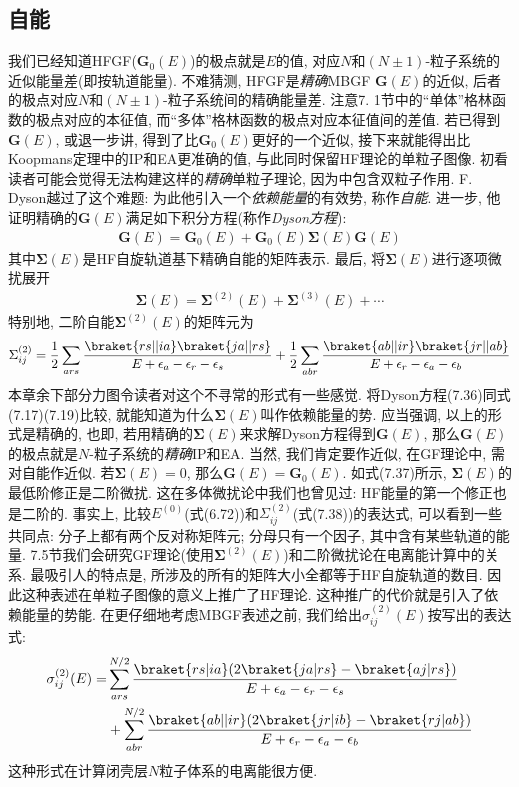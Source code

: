 \subsection{自能}
我们已经知道HFGF($\mathbf{G}_0(E)$)的极点就是$E$的值, 
对应$N$和$(N\pm1)$-粒子系统的近似能量差(即按轨道能量). 
不难猜测, 
HFGF是\emph{精确}MBGF $\mathbf{G}(E)$的近似, 
后者的极点对应$N$和$(N\pm1)$-粒子系统间的精确能量差. 
注意7.
1节中的“单体”格林函数的极点对应\ha 的本征值, 
而“多体”格林函数的极点对应本征值间的差值. 
若已得到$\mathbf{G}(E)$, 
或退一步讲, 
得到了比$\mathbf{G}_0(E)$更好的一个近似, 
接下来就能得出比Koopmans定理中的IP和EA更准确的值, 
与此同时保留HF理论的单粒子图像. 
初看读者可能会觉得无法构建这样的\emph{精确}单粒子理论, 
因为\ha 中包含双粒子作用. 
F. Dyson越过了这个难题: 为此他引入一个\emph{依赖能量}的有效势, 
称作\emph{自能}. 
进一步, 
他证明精确的$\mathbf{G}(E)$满足如下积分方程(称作\emph{Dyson方程}):
\begin{align}\label{7.36}
\mathbf{G}(E) = \mathbf{G}_0(E) + \mathbf{G}_0(E)\mathbf{\Sigma}(E)\mathbf{G}(E) 
\end{align}
其中$\mathbf{\Sigma}(E)$是HF自旋轨道基下精确自能的矩阵表示. 
最后, 
将$\mathbf{\Sigma}(E)$进行逐项微扰展开
\begin{align}
\mathbf{\Sigma}(E) = \mathbf{\Sigma}^{(2)}(E) + \mathbf{\Sigma}^{(3)}(E) + \cdots
\end{align}
特别地, 
二阶自能$\mathbf{\Sigma}^{(2)}(E)$的矩阵元为
\begin{align}\label{7.38}
\Sigma_{ij}^{(2)} = \frac{1}{2}\sum_{ars}\frac{\braket{rs||ia}\braket{ja||rs}}{E+\epsilon_a-\epsilon_r-\epsilon_s} + 
\frac{1}{2}\sum_{abr}\frac{\braket{ab||ir}\braket{jr||ab}}{E+\epsilon_r-\epsilon_a-\epsilon_b}
\end{align}
本章余下部分力图令读者对这个不寻常的形式有一些感觉. 
将Dyson方程(7.36)同式(7.17)(7.19)比较, 
就能知道为什么$\mathbf{\Sigma}(E)$叫作依赖能量的势. 
应当强调, 
以上的形式是精确的, 
也即, 
若用精确的$\mathbf{\Sigma}(E)$来求解Dyson方程得到$\mathbf{G}(E)$, 
那么$\mathbf{G}(E)$的极点就是$N$-粒子系统的\emph{精确}IP和EA. 
当然, 
我们肯定要作近似, 
在GF理论中, 
需对自能作近似. 
若$\mathbf{\Sigma}(E)=0$, 
那么$\mathbf{G}(E)=\mathbf{G}_0(E)$. 
如式(7.37)所示, 
$\mathbf{\Sigma}(E)$的最低阶修正是二阶微扰. 
这在多体微扰论中我们也曾见过: HF能量的第一个修正也是二阶的. 
事实上, 
比较$E^{(0)}$(式(6.72))和$\Sigma_{ij}^{(2)}$(式(7.38))的表达式, 
可以看到一些共同点: 分子上都有两个反对称矩阵元; 
分母只有一个因子, 
其中含有某些轨道的能量. 
7.5节我们会研究GF理论(使用$\mathbf{\Sigma}^{(2)}(E)$)和二阶微扰论在电离能计算中的关系. 
最吸引人的特点是, 
所涉及的所有的矩阵大小全都等于HF自旋轨道的数目. 
因此这种表述在单粒子图像的意义上推广了HF理论. 
这种推广的代价就是引入了依赖能量的势能. 
在更仔细地考虑MBGF表述之前, 
我们给出$\sigma_{ij}^{(2)}(E)$按写出的表达式:
\begin{align}
\sigma_{ij}^{(2)}(E) = & \sum_{ars}^{N/2} \frac{\braket{rs|ia}(2\braket{ja|rs}-\braket{aj|rs})}{E+\epsilon_a-\epsilon_r-\epsilon_s}\notag\\
                     & + \sum_{abr}^{N/2}\frac{\braket{ab||ir}(2\braket{jr|ib}-\braket{rj|ab})}{E+\epsilon_r-\epsilon_a-\epsilon_b}
		     \label{7.39}
\end{align}
这种形式在计算闭壳层$N$粒子体系的电离能很方便.

